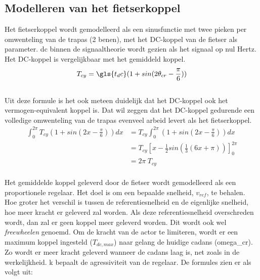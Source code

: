 \subsection*{Modelleren van het fietserkoppel}
Het fietserkoppel wordt gemodelleerd als een sinusfunctie met twee pieken per omwenteling van de trapas (2 benen), met het DC-koppel van de fietser als parameter. \gls{dc} binnen de signaaltheorie wordt gezien als het signaal op nul Hertz. Het DC-koppel is vergelijkbaar met het gemiddeld koppel.
\\
\begin{gather*}
 T_{cy} = \gls{t_dc}(1+sin(2\theta_{cr}-\frac{\pi}{6}))
\end{gather*}
\\
Uit deze formule is het ook meteen duidelijk dat het DC-koppel ook het vermogen-equivalent koppel is. Dat wil zeggen dat het DC-koppel gedurende een volledige omwenteling van de trapas evenveel arbeid levert als het fietserkoppel.
\\
\begin{align*}
\int_{0}^{2\pi} T_{cy}(1+sin(2x-\frac{\pi}{6})) dx &= T_{cy} \int_{0}^{2\pi}(1+sin(2x-\frac{\pi}{6})) dx\\
&= T_{cy} \left[x-\frac{1}{2}sin(\frac{1}{3}(6x+\pi))\right]_0^{2\pi}\\
&= 2\pi \ T_{cy}
\end{align*}
\\
\noindent
Het gemiddelde koppel geleverd door de fietser wordt gemodelleerd als een proportionele regelaar. Het doel is om een bepaalde snelheid, $v_{ref}$, te behalen. Hoe groter het verschil is tussen de referentiesnelheid en de eigenlijke snelheid, hoe meer kracht er geleverd zal worden. Als deze referentiesnelheid overschreden wordt, dan zal er geen koppel meer geleverd worden. Dit wordt ook wel \textit{freewheelen} genoemd. Om de kracht van de actor te limiteren, wordt er een maximum koppel ingesteld ($T_{dc,max}$) naar gelang de huidige cadans (\gls{omega_cr}). Zo wordt er meer kracht geleverd wanneer de cadans laag is, net zoals in de werkelijkheid. \gls{k} bepaalt de agressiviteit van de regelaar. De formules zien er als volgt uit:

